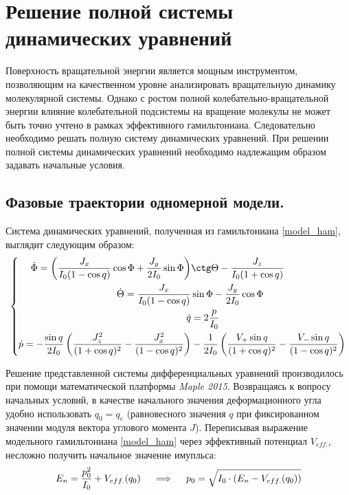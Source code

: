 \section{Решение полной системы динамических уравнений}
Поверхность вращательной энергии является мощным инструментом, позволяющим на качественном уровне анализировать вращательную динамику молекулярной системы. Однако с ростом полной колебательно-вращательной энергии влияние колебательной подсистемы на вращение молекулы не может быть точно учтено в рамках эффективного гамильтониана. Следовательно необходимо решать полную систему динамических уравнений. При решении полной системы динамических уравнений необходимо надлежащим образом задавать начальные условия.

\subsection{Фазовые траектории одномерной модели.}

Система динамических уравнений, полученная из гамильтониана \eqref{model_ham}, выглядит следующим образом:
\vverh
\begin{gather}
\left\{
\begin{aligned}
\dot{\Phi} = \left( \frac{J_x}{I_0 ( 1 - \cos q)} \cos \Phi + \frac{J_y}{2I_0} \sin \Phi \right) &\ctg \Theta - \frac{J_z}{I_0 (1 + \cos q)} \\
\dot{\Theta} = \frac{J_x}{I_0 (1 - \cos q)} &\sin \Phi - \frac{J_y}{2I_0} \cos \Phi \\
\dot{q} &= 2	\frac{p}{I_0} \\
\dot{p} = - \frac{\sin q}{2I_0} \left( \frac{J_z^2}{(1 + \cos q)^2} - \frac{J_x^2}{(1 - \cos q)^2} \right) &- \frac{1}{2I_0} \left( \frac{V_{+} \sin q}{(1 + \cos q)^2} - \frac{V_{-} \sin q}{(1 - \cos q)^2} \right)
\end{aligned}
\right. \notag
\end{gather}

Решение представленной системы дифференциальных уравнений производилось при помощи математической платформы \textit{Maple 2015}. Возвращаясь к вопросу начальных условий, в качестве начального значения деформационного угла удобно использовать $q_0 = q_e$ (равновесного значения $q$ при фиксированном значении модуля вектора углового момента $J$). Переписывая выражение модельного гамильтониана \eqref{model_ham} через эффективный потенциал $V_{eff.}$, несложно получить начальное значение имупльса:
\vverh
\begin{gather}
E_n = \frac{p_0^2}{I_0} + V_{eff.} (q_0) \quad \implies \quad p_0 = \sqrt{I_0 \cdot \left( E_n - V_{eff.} (q_0) \right) } \notag
\end{gather}

